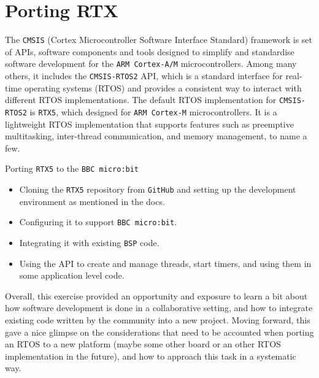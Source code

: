 \section*{Porting RTX}

The \texttt{CMSIS} (Cortex Microcontroller Software Interface Standard) framework is set of APIs, software components and tools designed to simplify and standardise software development for the \texttt{ARM Cortex-A/M} microcontrollers.
Among many others, it includes the \texttt{CMSIS-RTOS2} API, which is a standard interface for real-time operating systems (RTOS) and provides a consistent way to interact with different RTOS implementations.
The default RTOS implementation for \texttt{CMSIS-RTOS2} is \texttt{RTX5}, which designed for \texttt{ARM Cortex-M} microcontrollers.
It is a lightweight RTOS implementation that supports features such as preemptive multitasking, inter-thread communication, and memory management, to name a few.

Porting \texttt{RTX5} to the \texttt{BBC micro:bit}
\begin{itemize}[noitemsep, topsep=0pt]
    \item Cloning the \texttt{RTX5} repository from \texttt{GitHub} and setting up the development environment as mentioned in the docs.
    \item Configuring it to support \texttt{BBC micro:bit}.
    \item Integrating it with existing \texttt{BSP} code.
    \item Using the API to create and manage threads, start timers, and using them in some application level code.
\end{itemize}

Overall, this exercise provided an opportunity and exposure to learn a bit about how software development is done in a collaborative setting, and how to integrate existing code written by the community into a new project.
Moving forward, this gave a nice glimpse on the considerations that need to be accounted when porting an RTOS to a new platform (maybe some other board or an other RTOS implementation in the future), and how to approach this task in a systematic way.
